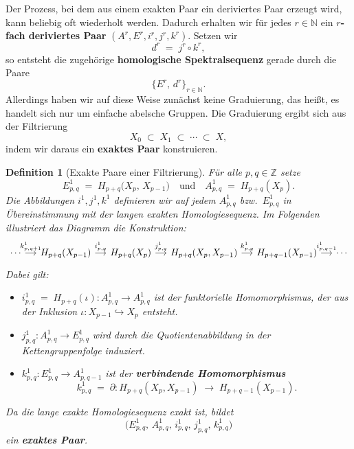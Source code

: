 \documentclass[12pt]{article}
\numberwithin{conj}{section}
\newtheorem{definition}[conj]{Definition}
\newcommand{\Z}{\mathbb{Z}}
\begin{document}
    Der Prozess, bei dem aus einem exakten Paar ein deriviertes Paar erzeugt wird,
    kann beliebig oft wiederholt werden. Dadurch erhalten wir für jedes
    $r \in \mathbb{N}$ ein \textbf{$r$-fach deriviertes Paar} $(A^{r}, E^{r}, i^{r}
    , j^{r}, k^{r})$. Setzen wir
    \[
        d^{r} \;=\; j^{r} \circ k^{r},
    \]
    so entsteht die zugehörige \textbf{homologische Spektralsequenz} gerade durch die
    Paare
    \[
        \{E^{r},\, d^{r}\}_{r \in \mathbb{N}}.
    \]
    Allerdings haben wir auf diese Weise zunächst keine Graduierung, das heißt, es
    handelt sich nur um einfache abelsche Gruppen. Die Graduierung ergibt sich aus
    der Filtrierung
    \[
        X_{0} \;\subset\; X_{1} \;\subset\; \cdots \;\subset\; X,
    \]
    indem wir daraus ein \textbf{exaktes Paar} konstruieren.

    \begin{definition}[Exakte Paare einer Filtrierung]
        \label{exaktFiltration} Für alle $p,q \in \Z$ setze
        \[
            E^{1}_{p,q}\;=\; H_{p+q}\bigl(X_{p},\,X_{p-1}\bigr) \quad\text{und}\quad A^{1}
            _{p,q}\;=\; H_{p+q}(X_{p}).
        \]
        Die Abbildungen $i^{1}, j^{1}, k^{1}$ definieren wir auf jedem $A^{1}_{p,q}$
        bzw.\ $E^{1}_{p,q}$ in Übereinstimmung mit der langen exakten
        Homologiesequenz. Im Folgenden illustriert das Diagramm die Konstruktion:
        \[\begin{tikzcd}[sep=small]
            \cdots & {H_{p+q}(X_{p-1})} & {H_{p+q}(X_{p})} & {H_{p+q}(X_{p},X_{p-1})} & {H_{p+q-1}(X_{p-1})} & \cdots
            \arrow["{k^1_{p,q+1}}", from=1-1, to=1-2]
            \arrow["{i^1_{p,q}}", from=1-2, to=1-3]
            \arrow["{j^1_{p,q}}", from=1-3, to=1-4]
            \arrow["{k^1_{p,q}}", from=1-4, to=1-5]
            \arrow["{i^1_{p,q-1}}", from=1-5, to=1-6]
        \end{tikzcd}\]
        Dabei gilt:
        \begin{itemize}[nolistsep]
            \item $i^{1}_{p,q}\;=\; H_{p+q}(\iota) : A^{1}_{p,q}\to A^{1}_{p,q}$ ist der
                funktorielle Homomorphismus, der aus der Inklusion
                $\iota: X_{p-1}\hookrightarrow X_{p}$ entsteht.

            \item $j^{1}_{p,q}: A^{1}_{p,q}\to E^{1}_{p,q}$ wird durch die Quotientenabbildung
                in der Kettengruppenfolge induziert.

            \item $k^{1}_{p,q}: E^{1}_{p,q}\to A^{1}_{p,q-1}$ ist der \textbf{verbindende
                Homomorphismus}
                \[
                    k^{1}_{p,q}\;=\; \partial : H_{p+q}(X_{p},X_{p-1}) \;\longrightarrow\;
                    H_{p+q-1}(X_{p-1}).
                \]
        \end{itemize}
        Da die lange exakte Homologiesequenz exakt ist, bildet
        \[
            \bigl( E^{1}_{p,q},\,A^{1}_{p,q},\,i^{1}_{p,q},\,j^{1}_{p,q},\,k^{1}_{p,q}\bigr
            )
        \]
        ein \textbf{exaktes Paar}.
    \end{definition}
\end{document}
